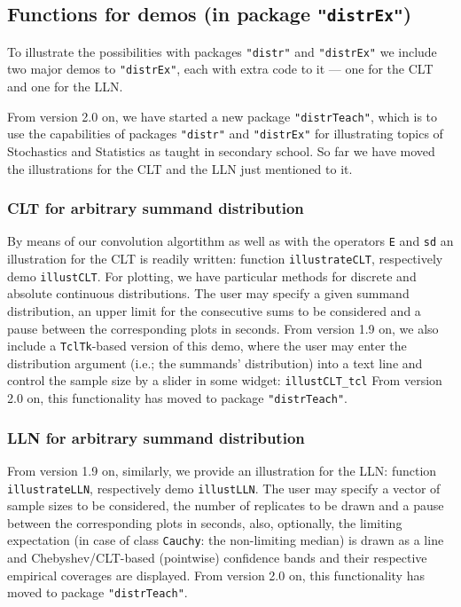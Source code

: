 \documentclass[11pt]{article}
\newcommand{\code}[1]{{\tt #1}}
\newcommand{\pkg}[1]{{\tt "#1"}}
\begin{document}
\subsection[Functions for demos (in package distrEx)]{Functions for demos 
(in package \pkg{distrEx})}\label{Demos}
%
To illustrate the possibilities with packages \pkg{distr} and \pkg{distrEx} we 
include two major demos to \pkg{distrEx}, each with extra code to it ---
one for the CLT and one for the LLN.

From version 2.0 on, we have started a new package \pkg{distrTeach}, which
is to use the capabilities of packages \pkg{distr} and \pkg{distrEx} for
illustrating topics of Stochastics and Statistics as taught in secondary
school. So far we have moved the illustrations for the CLT and the LLN 
just mentioned to it.

\subsubsection{CLT for arbitrary summand distribution}

By means of our convolution algortithm as well as with the operators \code{E} 
and \code{sd} an illustration for the CLT is readily written: 
function \code{illustrateCLT}, respectively demo \code{illustCLT}.
For plotting, we have particular methods for discrete and absolute continuous 
distributions. The user may specify a given summand distribution, an upper 
limit for the consecutive sums to be considered and a pause between the 
corresponding plots in seconds. From version 1.9 on, we also include a 
\code{TclTk}-based version of this demo, where the user may enter the 
distribution argument (i.e.; the summands' distribution) into a text line and 
control the sample size by a slider in some widget: \code{illustCLT\_tcl}
From version 2.0 on, this functionality has moved to package \pkg{distrTeach}.

\subsubsection{LLN for arbitrary summand distribution}

From version 1.9 on, similarly, we provide an illustration for the LLN:
function \code{illustrateLLN}, respectively demo \code{illustLLN}.
The user may specify a vector of sample sizes to be 
considered, the number of replicates to be drawn and a pause between the 
corresponding plots in seconds, also, optionally, the limiting expectation
(in case of class \code{Cauchy}: the non-limiting median) is drawn as a line and
Chebyshev/CLT-based (pointwise) confidence bands and their respective empirical 
coverages are displayed. 
From version 2.0 on, this functionality has moved to package \pkg{distrTeach}.
\end{document}
